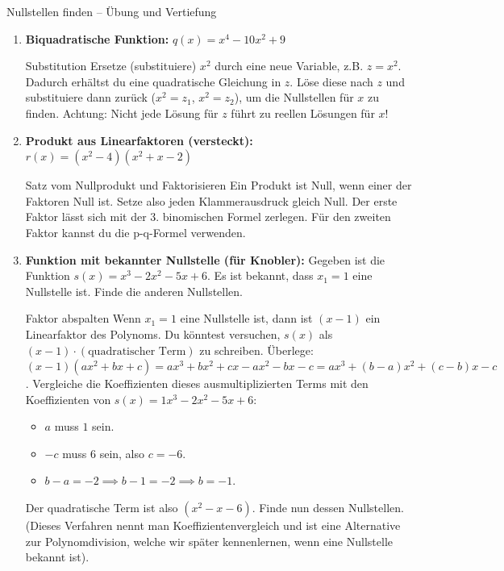 \begin{aufgabenumgebung}{Nullstellen finden – Übung und Vertiefung}
\begin{enumerate}
    \item \textbf{Biquadratische Funktion:}
        $q(x) = x^4 - 10x^2 + 9$
        \begin{tippumgebung}{Substitution}
        Ersetze (substituiere) $x^2$ durch eine neue Variable, z.B. $z = x^2$. Dadurch erhältst du eine quadratische Gleichung in $z$. Löse diese nach $z$ und substituiere dann zurück ($x^2 = z_1$, $x^2 = z_2$), um die Nullstellen für $x$ zu finden. Achtung: Nicht jede Lösung für $z$ führt zu reellen Lösungen für $x$!
        \end{tippumgebung}

    \item \textbf{Produkt aus Linearfaktoren (versteckt):}
        $r(x) = (x^2-4)(x^2+x-2)$
        \begin{tippumgebung}{Satz vom Nullprodukt und Faktorisieren}
        Ein Produkt ist Null, wenn einer der Faktoren Null ist. Setze also jeden Klammerausdruck gleich Null. Der erste Faktor lässt sich mit der 3. binomischen Formel zerlegen. Für den zweiten Faktor kannst du die p-q-Formel verwenden.
        \end{tippumgebung}

    \item \textbf{Funktion mit bekannter Nullstelle (für Knobler):}
        Gegeben ist die Funktion $s(x) = x^3 - 2x^2 - 5x + 6$. Es ist bekannt, dass $x_1=1$ eine Nullstelle ist. Finde die anderen Nullstellen.
        \begin{tippumgebung}{Faktor abspalten}
        Wenn $x_1=1$ eine Nullstelle ist, dann ist $(x-1)$ ein Linearfaktor des Polynoms. Du könntest versuchen, $s(x)$ als $(x-1) \cdot (\text{quadratischer Term})$ zu schreiben.
        Überlege: $(x-1)(ax^2+bx+c) = ax^3 + bx^2 + cx - ax^2 - bx - c = ax^3 + (b-a)x^2 + (c-b)x - c$.
        Vergleiche die Koeffizienten dieses ausmultiplizierten Terms mit den Koeffizienten von $s(x)=1x^3 - 2x^2 - 5x + 6$:
        \begin{itemize}
            \item $a$ muss $1$ sein.
            \item $-c$ muss $6$ sein, also $c=-6$.
            \item $b-a = -2 \implies b-1 = -2 \implies b = -1$.
        \end{itemize}
        Der quadratische Term ist also $(x^2-x-6)$. Finde nun dessen Nullstellen. (Dieses Verfahren nennt man Koeffizientenvergleich und ist eine Alternative zur Polynomdivision, welche wir später kennenlernen, wenn eine Nullstelle bekannt ist).
        \end{tippumgebung}


\end{enumerate}
\end{aufgabenumgebung}
